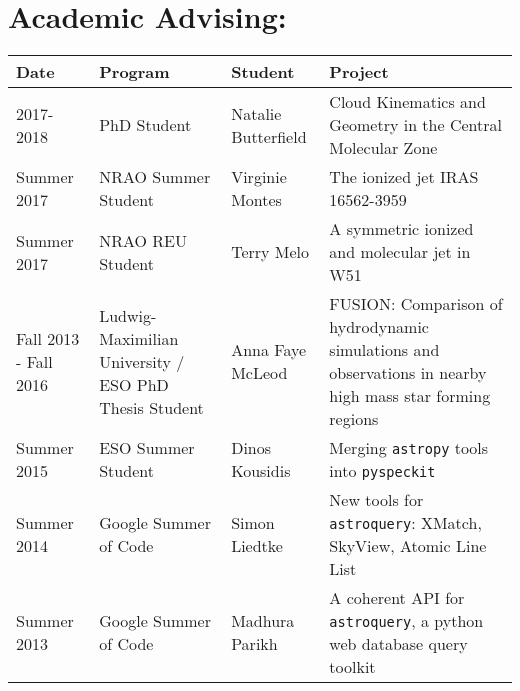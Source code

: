 \setlength{\extrarowheight}{4pt}
\section*{Academic Advising: }
\vspace{-12pt}
\begin{tabular}{p{0.75in}p{1.2in}lp{2.6in}}
    Date  & Program & Student &  Project \\
    \hline
    2017-2018 & PhD Student &                                                        Natalie Butterfield &  Cloud Kinematics and Geometry in the Central Molecular Zone \\
    Summer 2017 & NRAO Summer Student &                                              Virginie Montes    &  The ionized jet IRAS 16562-3959 \\
    Summer 2017 & NRAO REU Student &                                                 Terry Melo    &  A symmetric ionized and molecular jet in W51 \\
    Fall 2013 - Fall 2016 & Ludwig-Maximilian University / ESO PhD Thesis Student & Anna Faye McLeod &  FUSION: Comparison of hydrodynamic simulations and observations in nearby high mass star forming regions  \\
    Summer 2015 & ESO Summer Student &                                                 Dinos Kousidis    &  Merging \texttt{astropy} tools into \texttt{pyspeckit} \\
    Summer 2014 & Google Summer of Code &                                                 Simon Liedtke    &  New tools for \texttt{astroquery}: XMatch, SkyView, Atomic Line List \\
    Summer 2013 & Google Summer of Code &                                                 Madhura Parikh   &  A coherent API for \texttt{astroquery}, a python web database query toolkit \\
\end{tabular}

